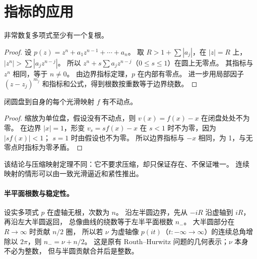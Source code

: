 \section{指标的应用}
\begin{theorem}[代数基本定理的指标证明]
非常数复多项式至少有一个复根。
\end{theorem}
\begin{proof}
设 $p(z)=z^n+a_1z^{n-1}+\cdots+a_n$。
取 $R>1+\sum|a_j|$，在 $|z|=R$ 上，
$|z^n|>\sum|a_jz^{n-j}|$。
所以 $z^n+s\sum a_jz^{n-j}$（$0\leq s\leq1$）在圆上无零点。
其指标与 $z^n$ 相同，等于 $n\ne0$。
由边界指标定理，$p$ 在内部有零点。
进一步用局部因子 $(z-z_j)^{m_j}$ 和指标和公式，得到根数按重数等于边界绕数。
\end{proof}
\begin{theorem}[圆盘不动点]
闭圆盘到自身的每个光滑映射 $f$ 有不动点。
\end{theorem}
\begin{proof}
缩放为单位盘，假设没有不动点，则 $v(x)=f(x)-x$ 在闭盘处处不为零。
在边界 $|x|=1$，形变 $v_s=sf(x)-x$ 在 $s<1$ 时不为零，因为 $|sf(x)|<1$；
$s=1$ 时由假设也不为零。
所以边界指标与 $-x$ 相同，为 1，与无零点时指标为零矛盾。
\end{proof}
该结论与压缩映射定理不同：它不要求压缩，却只保证存在、不保证唯一。
连续映射的情形可以由一致光滑逼近和紧性推出。

\paragraph{半平面根数与稳定性。}
设实多项式 $p$ 在虚轴无根，次数为 $n$。
沿左半圆边界，先从 $-iR$ 沿虚轴到 $iR$，再沿左大半圆返回，
总像曲线的绕数等于左半平面根数 $n_-$。
大半圆部分在 $R\to\infty$ 时贡献 $n/2$ 圈，
所以若 $\nu$ 为虚轴像 $p(it)$（$t:-\infty\to\infty$）的连续总角增除以 $2\pi$，则
$n_-=\nu+n/2$。
这是原有 Routh--Hurwitz 问题的几何表示；$\nu$ 本身不必为整数，
但与半圆贡献合并后是整数。

